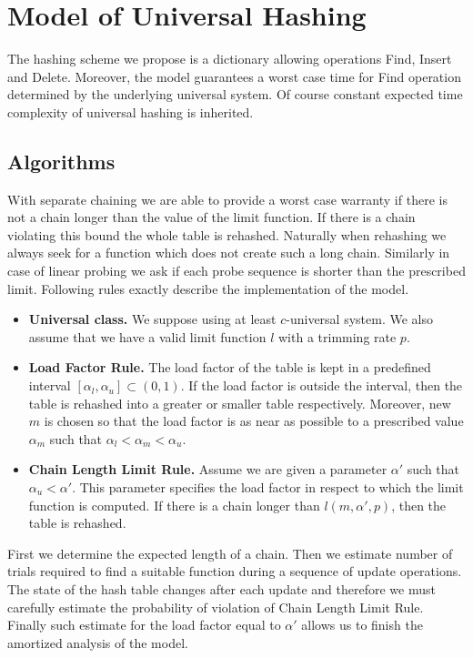 \section{Model of Universal Hashing}
\label{section-model}
The hashing scheme we propose is a dictionary allowing operations Find, Insert and Delete. Moreover, the model guarantees a worst case time for Find operation determined by the underlying universal system. Of course constant expected time complexity of universal hashing is inherited. 

\subsection{Algorithms}
With separate chaining we are able to provide a worst case warranty if there is not a chain longer than the value of the limit function. If there is a chain violating this bound the whole table is rehashed. Naturally when rehashing we always seek for a function which does not create such a long chain. Similarly in case of linear probing we ask if each probe sequence is shorter than the prescribed limit. Following rules exactly describe the implementation of the model.
\begin{itemize}
\item \textbf{Universal class.} We suppose using at least $c$-universal system. We also assume that we have a valid limit function $l$ with a trimming rate $p$.

\item \textbf{Load Factor Rule.} The load factor of the table is kept in a predefined interval $[\alpha_l, \alpha_u] \subset (0, 1)$. If the load factor is outside the interval, then the table is rehashed into a greater or smaller table respectively. Moreover, new $m$ is chosen so that the load factor is as near as possible to a prescribed value $\alpha_m$ such that $\alpha_l < \alpha_m < \alpha_u$. 

\item \textbf{Chain Length Limit Rule.} Assume we are given a parameter $\alpha'$ such that $\alpha_u < \alpha'$. This parameter specifies the load factor in respect to which the limit function is computed. If there is a chain longer than $l(m, \alpha', p)$, then the table is rehashed.
\end{itemize}

First we determine the expected length of a chain. Then we estimate number of trials required to find a suitable function during a sequence of update operations. The state of the hash table changes after each update and therefore we must carefully estimate the probability of violation of Chain Length Limit Rule. Finally such estimate for the load factor equal to $\alpha'$ allows us to finish the amortized analysis of the model.


